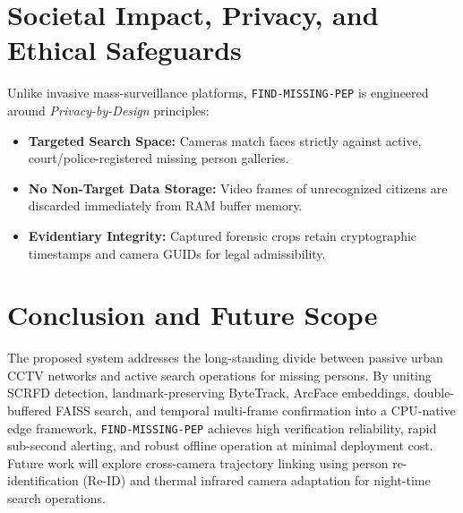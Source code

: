 \documentclass[10pt, a4paper]{article}
\begin{document}
\section{Societal Impact, Privacy, and Ethical Safeguards}
Unlike invasive mass-surveillance platforms, \texttt{FIND-MISSING-PEP} is engineered around \textit{Privacy-by-Design} principles:
\begin{itemize}
    \item \textbf{Targeted Search Space:} Cameras match faces strictly against active, court/police-registered missing person galleries.
    \item \textbf{No Non-Target Data Storage:} Video frames of unrecognized citizens are discarded immediately from RAM buffer memory.
    \item \textbf{Evidentiary Integrity:} Captured forensic crops retain cryptographic timestamps and camera GUIDs for legal admissibility.
\end{itemize}

\section{Conclusion and Future Scope}
The proposed system addresses the long-standing divide between passive urban CCTV networks and active search operations for missing persons. By uniting SCRFD detection, landmark-preserving ByteTrack, ArcFace embeddings, double-buffered FAISS search, and temporal multi-frame confirmation into a CPU-native edge framework, \texttt{FIND-MISSING-PEP} achieves high verification reliability, rapid sub-second alerting, and robust offline operation at minimal deployment cost. Future work will explore cross-camera trajectory linking using person re-identification (Re-ID) and thermal infrared camera adaptation for night-time search operations.
\end{document}
